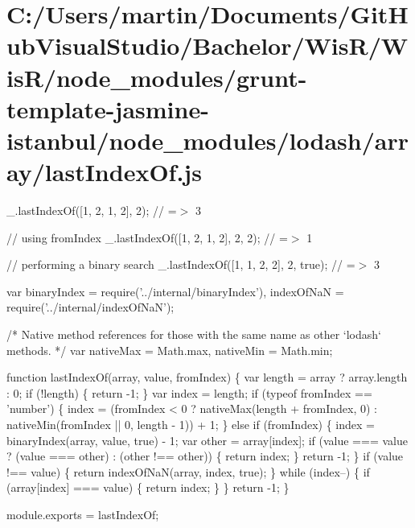 \hypertarget{_c_1_2_users_2martin_2_documents_2_git_hub_visual_studio_2_bachelor_2_wis_r_2_wis_r_2node_moduleb7bb7901f2d8b4538e544dd9ed2692b7}{}\section{C\+:/\+Users/martin/\+Documents/\+Git\+Hub\+Visual\+Studio/\+Bachelor/\+Wis\+R/\+Wis\+R/node\+\_\+modules/grunt-\/template-\/jasmine-\/istanbul/node\+\_\+modules/lodash/array/last\+Index\+Of.\+js}
\+\_\+.\+last\+Index\+Of(\mbox{[}1, 2, 1, 2\mbox{]}, 2); // =$>$ 3

// using {\ttfamily from\+Index} \+\_\+.\+last\+Index\+Of(\mbox{[}1, 2, 1, 2\mbox{]}, 2, 2); // =$>$ 1

// performing a binary search \+\_\+.\+last\+Index\+Of(\mbox{[}1, 1, 2, 2\mbox{]}, 2, true); // =$>$ 3


\begin{DoxyCodeInclude}
var binaryIndex = require(\textcolor{stringliteral}{'../internal/binaryIndex'}),
    indexOfNaN = require(\textcolor{stringliteral}{'../internal/indexOfNaN'});

\textcolor{comment}{/* Native method references for those with the same name as other `lodash` methods. */}
var nativeMax = Math.max,
    nativeMin = Math.min;

\textcolor{keyword}{function} lastIndexOf(array, value, fromIndex) \{
  var length = array ? array.length : 0;
  \textcolor{keywordflow}{if} (!length) \{
    \textcolor{keywordflow}{return} -1;
  \}
  var index = length;
  \textcolor{keywordflow}{if} (typeof fromIndex == \textcolor{stringliteral}{'number'}) \{
    index = (fromIndex < 0 ? nativeMax(length + fromIndex, 0) : nativeMin(fromIndex || 0, length - 1)) + 1;
  \} \textcolor{keywordflow}{else} \textcolor{keywordflow}{if} (fromIndex) \{
    index = binaryIndex(array, value, \textcolor{keyword}{true}) - 1;
    var other = array[index];
    \textcolor{keywordflow}{if} (value === value ? (value === other) : (other !== other)) \{
      \textcolor{keywordflow}{return} index;
    \}
    \textcolor{keywordflow}{return} -1;
  \}
  \textcolor{keywordflow}{if} (value !== value) \{
    \textcolor{keywordflow}{return} indexOfNaN(array, index, \textcolor{keyword}{true});
  \}
  \textcolor{keywordflow}{while} (index--) \{
    \textcolor{keywordflow}{if} (array[index] === value) \{
      \textcolor{keywordflow}{return} index;
    \}
  \}
  \textcolor{keywordflow}{return} -1;
\}

module.exports = lastIndexOf;
\end{DoxyCodeInclude}
 